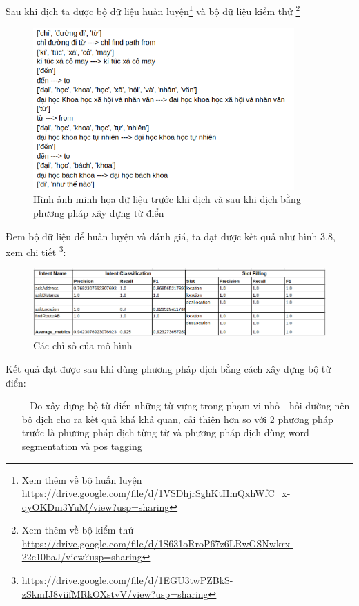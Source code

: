 Sau khi dịch ta được bộ dữ liệu huấn luyện\footnote{Xem thêm về bộ huấn luyện \url{https://drive.google.com/file/d/1VSDhjrSghKtHmQxhWfC_x-qyOKDm3YuM/view?usp=sharing}} và bộ dữ liệu kiểm thử \footnote{Xem thêm về bộ kiểm thử \url{https://drive.google.com/file/d/1S631oRroP67z6LRwGSNwkrx-22c10baJ/view?usp=sharing}}
\begin{figure}[htp]
    \centering
    \includegraphics[width=10cm]{images/trainingdata-tudien.png}
    \caption{Hình ảnh minh họa dữ liệu trước khi dịch và sau khi dịch bằng phương pháp xây dựng từ điển}
    \label{fig:sodohethongchiduong}

\end{figure}

Đem bộ dữ liệu để huấn luyện và đánh giá, ta đạt được kết quả như hình 3.8, xem chi tiết \footnote{\url{https://drive.google.com/file/d/1EGU3twPZBkS-zSkmIJ8viifMRkOXstvV/view?usp=sharing}}:

\begin{figure}[htp]
    \centering
    \includegraphics[width=15cm]{images/metrics-dict}
    \caption{Các chỉ số của mô hình}
    \label{fig:sodohethongchiduong}
\end{figure}
Kết quả đạt được sau khi dùng phương pháp dịch bằng cách xây dựng bộ từ điển:
\begin{itemize}
    \item[--] Do xây dựng bộ từ điển những từ vựng trong phạm vi nhỏ - hỏi đường nên bộ dịch cho ra kết quả khá khả quan, cải thiện hơn so với 2 phương pháp trước là phương pháp dịch từng từ và phương pháp dịch dùng word segmentation và pos tagging
\end{itemize}

